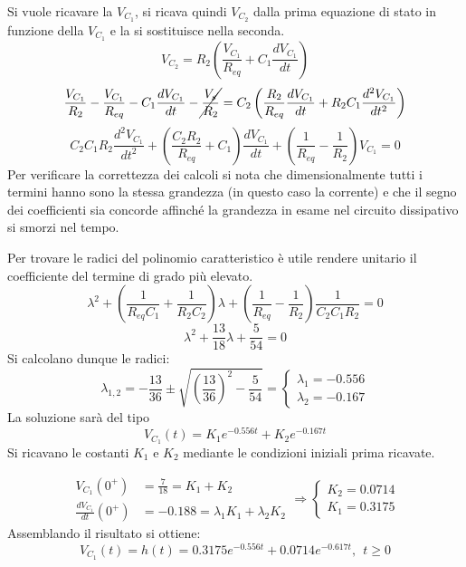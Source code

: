 Si vuole ricavare la $V_{C_1}$, si ricava quindi $V_{C_2}$ dalla prima equazione di stato in funzione della $V_{C_1}$ e la si sostituisce nella seconda.
$$
V_{C_2} = R_2 \left( \frac{V_{C_1}}{R_{eq}} + C_1\frac{dV_{C_1}}{dt} \right)
$$
$$
\frac{V_{C_1}}{R_2} - \frac{V_{C_1}}{R_{eq}} - C_1\frac{dV_{C_1}}{dt} - \cancel{\frac{V_s}{R_2}} = 
C_2\left(\frac{R_2}{R_{eq}}\frac{dV_{C_1}}{dt} + R_2C_1\frac{d^2V_{C_1}}{dt^2}\right)
$$
$$
C_2C_1R_2\frac{d^2V_{C_1}}{dt^2} + \left(\frac{C_2R_2}{R_{eq}}+C_1\right)\frac{dV_{C_1}}{dt} +
\left(\frac{1}{R_{eq}}-\frac{1}{R_2}\right)V_{C_1} = 0
$$
Per verificare la correttezza dei calcoli si nota che dimensionalmente tutti i termini 
hanno sono la stessa grandezza (in questo caso la corrente) e che il segno dei coefficienti
sia concorde affinché la grandezza in esame nel circuito dissipativo si smorzi nel tempo.

Per trovare le radici del polinomio caratteristico è utile rendere unitario il coefficiente del
termine di grado più elevato.
$$
\lambda^2 + \left(\frac{1}{R_{eq}C_1} + \frac{1}{R_2C_2}\right)\lambda + \left(\frac{1}{R_{eq}}-\frac{1}{R_2}\right)\frac{1}{C_2C_1R_2} = 0
$$
$$
\lambda^2+\frac{13}{18}\lambda + \frac{5}{54} = 0
$$
Si calcolano dunque le radici:
$$
\lambda_{1,2} = -\frac{13}{36} \pm \sqrt{\left(\frac{13}{36}\right)^2-\frac{5}{54}} = 
\begin{cases}
\lambda_1 = -0.556\\
\lambda_2 = -0.167
\end{cases}
$$
La soluzione sarà del tipo
$$
V_{C_1}(t) = K_1 e^{-0.556 t} + K_2 e^{-0.167 t}
$$
\newpage
Si ricavano le costanti $K_1$ e $K_2$ mediante le condizioni iniziali prima ricavate.

$$
\begin{aligned}
V_{C_1}(0^+) &= \frac{7}{18} = K_1 + K_2 \\
\frac{dV_{C_1}}{dt}(0^+) &= -0.188 = \lambda_1K_1 + \lambda_2K_2
\end{aligned}
\Rightarrow
\begin{cases}
K_2 = 0.0714\\
K_1 = 0.3175
\end{cases}
$$
Assemblando il risultato si ottiene:
$$
V_{C_1}(t) = h(t) = 0.3175e^{-0.556 t} + 0.0714 e ^{-0.617 t}, \ \ t\geq 0
$$

